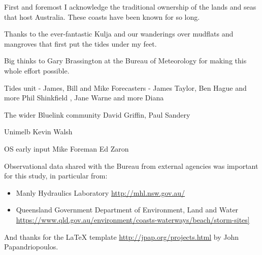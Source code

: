 
\begin{acknowledgements}

{\parindent0pt

First and foremost I acknowledge the traditional ownership of the lands and seas that host Australia. These coasts have been known for so long.
\newline{}

Thanks to the ever-fantastic Kulja and our wanderings over mudflats and mangroves that first put the tides under my feet.   
    
    
Big thinks to Gary Brassington at the Bureau of Meteorology for making this whole effort possible.


Tides  unit - James, Bill and Mike
Forecasters - James Taylor, Ben Hague and more
Phil Shinkfield , Jane Warne and more
Diana
    
The wider Bluelink community
David Griffin, Paul Sandery    
    
Unimelb
Kevin Walsh

OS early input 
Mike Foreman
Ed Zaron


Observational data shared with the Bureau from external agencies was important for this study, in particular from:
\begin{itemize}
    \item Manly Hydraulics Laboratory \url{http://mhl.nsw.gov.au/}
    \item Queensland Government Department of Environment, Land and Water \url{https://www.qld.gov.au/environment/coasts-waterways/beach/storm-sites]}
\end{itemize}


And thanks for the LaTeX template \url{http://jpap.org/projects.html} by John Papandriopoulos.

}   %
\end{acknowledgements}
